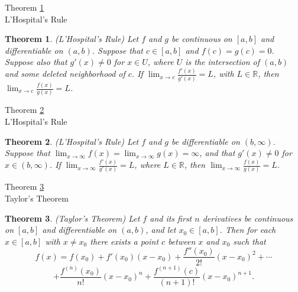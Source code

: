 \documentclass[avery5371,grid]{flashcards}
\newtheorem{theorem}{Theorem}
\newcommand{\bb}[1]{\mathbb{#1}}
\newcommand{\R}{\bb{R}}
\begin{document}
\begin{flashcard}[Theorem]{Theorem \ref{thm91}\\ L'Hospital's Rule}
\begin{theorem}
\label{thm91}
(L'Hospital's Rule)  Let $f$ and $g$ be continuous on $[a,b]$ and
differentiable on $(a,b)$.  Suppose that $c \in [a,b]$ and
$f(c) = g(c)=0$.  Suppose also that $g'(x) \not= 0$ for $x \in U$, where
$U$ is the intersection of $(a,b)$ and some deleted neighborhood of $c$.
If $\displaystyle \lim _{x \to c} \frac{f'(x)}{g'(x)} = L$, with $L \in
\R$, then $\displaystyle \lim _{x \to c} \frac{f(x)}{g(x)} = L$.
\end{theorem}
\end{flashcard}

\begin{flashcard}[Theorem]{Theorem \ref{thm92}\\ L'Hospital's Rule}
\begin{theorem}
\label{thm92}
(L'Hospital's Rule)  Let $f$ and $g$ be differentiable on $(b, \infty)$.
Suppose that $\lim _{ x \to \infty} f(x) = \lim _{x \to \infty} g(x) =
\infty$, and that $g'(x) \not= 0$ for $x \in (b, \infty)$.  If
$\displaystyle \lim _{x \to \infty} \frac{f'(x)}{g'(x)} = L$, where
$L \in \R$, then $\displaystyle \lim _{x \to \infty} \frac{f(x)}{g(x)} = L$.
\end{theorem}
\end{flashcard}

\begin{flashcard}[Theorem]{Theorem \ref{thm93}\\ Taylor's Theorem}
\begin{theorem}
\label{thm93}
(Taylor's Theorem)  Let $f$ and its first $n$ derivatives be continuous
on $[a,b]$ and differentiable on $(a,b)$, and let $x_0 \in [a,b]$.  Then
for each $x \in [a,b]$ with $x \not= x_0$ there exists a point $c$
between $x$ and $x_0$ such that
$$f(x) = f(x_0) + f'(x_0)(x-x_0) + \frac{f''(x_0)}{2!}(x-x_0)^2 + \cdots $$
$$+ \frac{f^{(n)}(x_0)}{n!}(x-x_0)^n + \frac{f^{(n+1)}(c)}{(n+1)!}(x-x_0)^{n+1}.$$
\end{theorem}
\end{flashcard}
\end{document}

